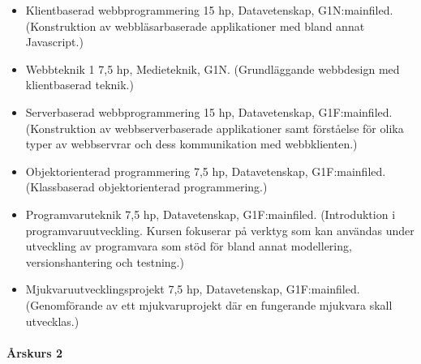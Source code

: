 \documentclass[swedish]{LnuCmThesis}
\begin{document}
\begin{itemize}
    \item Klientbaserad webbprogrammering 15 hp, Datavetenskap, G1N\fn:mainfiled{}. (Konstruktion av webbläsarbaserade applikationer med bland annat Javascript.)
    \item Webbteknik 1 7,5 hp, Medieteknik, G1N. (Grundläggande webbdesign med klientbaserad teknik.)
    \item Serverbaserad webbprogrammering 15 hp, Datavetenskap, G1F\fn:mainfiled{}. (Konstruktion av webbserverbaserade applikationer samt förståelse för olika typer av webbservrar och dess kommunikation med webbklienten.)
    \item Objektorienterad programmering 7,5 hp, Datavetenskap, G1F\fn:mainfiled{}. (Klassbaserad objektorienterad programmering.)
    \item Programvaruteknik 7,5 hp, Datavetenskap, G1F\fn:mainfiled{}. (Introduktion i programvaruutveckling. Kursen fokuserar på verktyg som kan användas under utveckling av programvara som stöd för bland annat modellering, versionshantering och testning.)
    \item Mjukvaruutvecklingsprojekt 7,5 hp, Datavetenskap, G1F\fn:mainfiled{}. (Genomförande av ett mjukvaruprojekt där en fungerande mjukvara skall utvecklas.)
\end{itemize}

\paragraph*{Årskurs 2}
\end{document}
